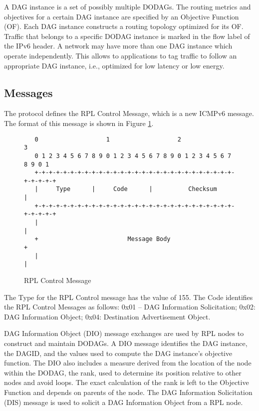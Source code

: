 A DAG instance is a set of possibly multiple DODAGs. The routing metrics and objectives for a certain DAG instance are specified by an Objective Function (OF). Each DAG instance constructs a routing topology optimized for its OF. Traffic that belongs to a specific DODAG instance is marked in the flow label of the IPv6 header. A network may have more than one DAG instance which operate independently. This allows to applications to tag traffic to follow an appropriate DAG instance, i.e., optimized for low latency or low energy.  

\subsection{Messages}
The protocol defines the RPL Control Message, which is a new ICMPv6 message. The format of this message is shown in Figure \ref{fig:rpl.control.message}.
\begin{figure}[htp]
\begin{mylisting}
\begin{verbatim}
   0                   1                   2                   3
   0 1 2 3 4 5 6 7 8 9 0 1 2 3 4 5 6 7 8 9 0 1 2 3 4 5 6 7 8 9 0 1
   +-+-+-+-+-+-+-+-+-+-+-+-+-+-+-+-+-+-+-+-+-+-+-+-+-+-+-+-+-+-+-+-+
   |     Type      |     Code      |          Checksum             |
   +-+-+-+-+-+-+-+-+-+-+-+-+-+-+-+-+-+-+-+-+-+-+-+-+-+-+-+-+-+-+-+-+
   |                                                               |
   +                         Message Body                          +
   |                                                               |
\end{verbatim}
\end{mylisting}
\caption{RPL Control Message}\label{fig:rpl.control.message}
\end{figure}

The Type for the RPL Control message has the value of 155. The Code identifies the RPL Control Messages as follows:  0x01 -- DAG Information Solicitation; 0x02: DAG Information Object; 0x04: Destination Advertisement Object. 

DAG Information Object (DIO) message exchanges are used by RPL nodes to construct and maintain DODAGs. A DIO message identifies the DAG instance, the DAGID, and the values used to compute the DAG instance's objective function. The DIO also includes a measure derived from the location of the node within the DODAG, the rank, used to determine its position relative to other nodes and avoid loops. The exact calculation of the rank is left to the Objective Function and  depends on parents of the node. The DAG Information Solicitation (DIS) message is used to solicit a DAG Information Object from a RPL node. 

